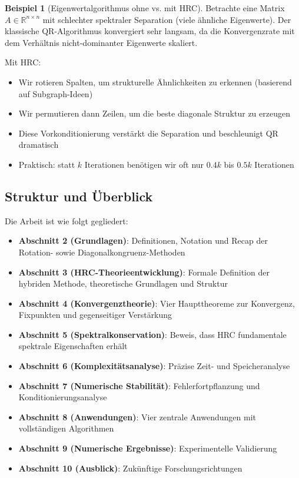 \documentclass[a4paper,12pt]{article}
\theoremstyle{definition}
\newtheorem{beispiel}{Beispiel}
\begin{document}
\begin{beispiel}[Eigenwertalgorithmus ohne vs. mit HRC]
	Betrachte eine Matrix $A \in \mathbb{R}^{n \times n}$ mit schlechter spektraler Separation (viele ähnliche Eigenwerte). Der klassische QR-Algorithmus konvergiert sehr langsam, da die Konvergenzrate mit dem Verhältnis nicht-dominanter Eigenwerte skaliert.
	
	Mit HRC:
	\begin{itemize}
		\item Wir rotieren Spalten, um strukturelle Ähnlichkeiten zu erkennen (basierend auf Subgraph-Ideen)
		\item Wir permutieren dann Zeilen, um die beste diagonale Struktur zu erzeugen
		\item Diese Vorkonditionierung verstärkt die Separation und beschleunigt QR dramatisch
		\item Praktisch: statt $k$ Iterationen benötigen wir oft nur $0.4k$ bis $0.5k$ Iterationen
	\end{itemize}
\end{beispiel}

\subsection{Struktur und Überblick}

Die Arbeit ist wie folgt gegliedert:

\begin{itemize}
	\item \textbf{Abschnitt 2 (Grundlagen)}: Definitionen, Notation und Recap der Rotation- sowie Diagonalkongruenz-Methoden
	\item \textbf{Abschnitt 3 (HRC-Theorieentwicklung)}: Formale Definition der hybriden Methode, theoretische Grundlagen und Struktur
	\item \textbf{Abschnitt 4 (Konvergenztheorie)}: Vier Haupttheoreme zur Konvergenz, Fixpunkten und gegenseitiger Verstärkung
	\item \textbf{Abschnitt 5 (Spektralkonservation)}: Beweis, dass HRC fundamentale spektrale Eigenschaften erhält
	\item \textbf{Abschnitt 6 (Komplexitätsanalyse)}: Präzise Zeit- und Speicheranalyse
	\item \textbf{Abschnitt 7 (Numerische Stabilität)}: Fehlerfortpflanzung und Konditionierungsanalyse
	\item \textbf{Abschnitt 8 (Anwendungen)}: Vier zentrale Anwendungen mit vollständigen Algorithmen
	\item \textbf{Abschnitt 9 (Numerische Ergebnisse)}: Experimentelle Validierung
	\item \textbf{Abschnitt 10 (Ausblick)}: Zukünftige Forschungsrichtungen
\end{itemize}
\end{document}
